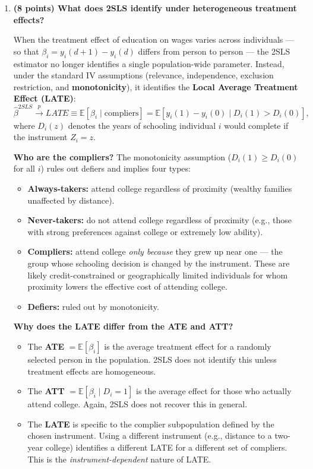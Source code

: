 \documentclass[letterpaper,12pt]{article}
\begin{document}
\begin{enumerate}[label=(\alph*)]
\item \textbf{(8 points) What does 2SLS identify under heterogeneous treatment effects?}

\medskip
When the treatment effect of education on wages varies across individuals --- so that $\beta_i = y_i(d+1) - y_i(d)$ differs from person to person --- the 2SLS estimator no longer identifies a single population-wide parameter. Instead, under the standard IV assumptions (relevance, independence, exclusion restriction, and \textbf{monotonicity}), it identifies the \textbf{Local Average Treatment Effect (LATE)}:
\[
\hat{\beta}^{2SLS} \xrightarrow{p} LATE \equiv \mathbb{E}[\beta_i \mid \text{compliers}] = \mathbb{E}[y_i(1) - y_i(0) \mid D_i(1) > D_i(0)],
\]
where $D_i(z)$ denotes the years of schooling individual $i$ would complete if the instrument $Z_i = z$.

\medskip
\textbf{Who are the compliers?} The monotonicity assumption ($D_i(1) \geq D_i(0)$ for all $i$) rules out defiers and implies four types:
\begin{itemize}
    \item \textbf{Always-takers:} attend college regardless of proximity (wealthy families unaffected by distance).
    \item \textbf{Never-takers:} do not attend college regardless of proximity (e.g., those with strong preferences against college or extremely low ability).
    \item \textbf{Compliers:} attend college \emph{only because} they grew up near one --- the group whose schooling decision is changed by the instrument. These are likely credit-constrained or geographically limited individuals for whom proximity lowers the effective cost of attending college.
    \item \textbf{Defiers:} ruled out by monotonicity.
\end{itemize}

\medskip
\textbf{Why does the LATE differ from the ATE and ATT?}
\begin{itemize}
    \item The \textbf{ATE} $= \mathbb{E}[\beta_i]$ is the average treatment effect for a randomly selected person in the population. 2SLS does not identify this unless treatment effects are homogeneous.
    \item The \textbf{ATT} $= \mathbb{E}[\beta_i \mid D_i = 1]$ is the average effect for those who actually attend college. Again, 2SLS does not recover this in general.
    \item The \textbf{LATE} is specific to the complier subpopulation defined by the chosen instrument. Using a different instrument (e.g., distance to a two-year college) identifies a different LATE for a different set of compliers. This is the \emph{instrument-dependent} nature of LATE.
\end{itemize}


\end{enumerate}
\end{document}
